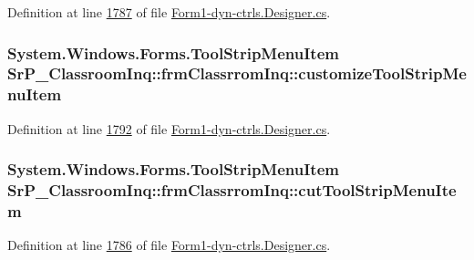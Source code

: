 \-Definition at line \hyperlink{_form1-dyn-ctrls_8_designer_8cs_source_l01787}{1787} of file \hyperlink{_form1-dyn-ctrls_8_designer_8cs_source}{\-Form1-\/dyn-\/ctrls.\-Designer.\-cs}.

\hypertarget{class_sr_p___classroom_inq_1_1frm_classrrom_inq_a3296cc0b41841b3014df5c5759d9e839}{
\subsubsection[{customize\-Tool\-Strip\-Menu\-Item}]{\setlength{\rightskip}{0pt plus 5cm}\-System.\-Windows.\-Forms.\-Tool\-Strip\-Menu\-Item {\bf \-Sr\-P\-\_\-\-Classroom\-Inq\-::frm\-Classrrom\-Inq\-::customize\-Tool\-Strip\-Menu\-Item}}}
\label{class_sr_p___classroom_inq_1_1frm_classrrom_inq_a3296cc0b41841b3014df5c5759d9e839}


\-Definition at line \hyperlink{_form1-dyn-ctrls_8_designer_8cs_source_l01792}{1792} of file \hyperlink{_form1-dyn-ctrls_8_designer_8cs_source}{\-Form1-\/dyn-\/ctrls.\-Designer.\-cs}.

\hypertarget{class_sr_p___classroom_inq_1_1frm_classrrom_inq_a62b714f774f74f0e4a36f60909cf7d78}{
\subsubsection[{cut\-Tool\-Strip\-Menu\-Item}]{\setlength{\rightskip}{0pt plus 5cm}\-System.\-Windows.\-Forms.\-Tool\-Strip\-Menu\-Item {\bf \-Sr\-P\-\_\-\-Classroom\-Inq\-::frm\-Classrrom\-Inq\-::cut\-Tool\-Strip\-Menu\-Item}}}
\label{class_sr_p___classroom_inq_1_1frm_classrrom_inq_a62b714f774f74f0e4a36f60909cf7d78}


\-Definition at line \hyperlink{_form1-dyn-ctrls_8_designer_8cs_source_l01786}{1786} of file \hyperlink{_form1-dyn-ctrls_8_designer_8cs_source}{\-Form1-\/dyn-\/ctrls.\-Designer.\-cs}.

